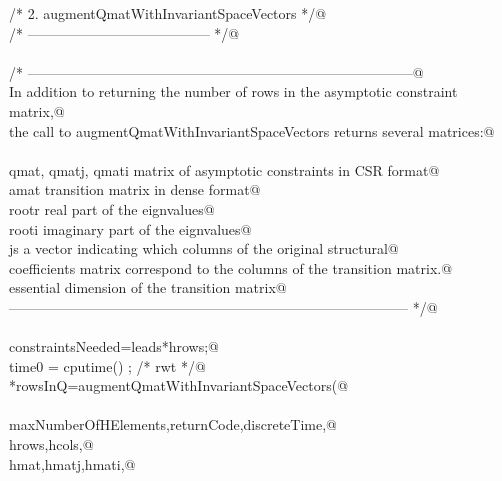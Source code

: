 \documentclass[12pt]{article}
\begin{document}
\begin{flushleft}
\begin{minipage}{\linewidth}
\begin{list}{}{}
\mbox{}\verb@        /* 2. augmentQmatWithInvariantSpaceVectors */@\\
\mbox{}\verb@        /* --------------------------------------- */@\\
\mbox{}\verb@@\\
\mbox{}\verb@        /* -----------------------------------------------------------------------------------@\\
\mbox{}\verb@        In addition to returning the number of rows in the asymptotic constraint matrix,@\\
\mbox{}\verb@        the call to augmentQmatWithInvariantSpaceVectors returns several matrices:@\\
\mbox{}\verb@@\\
\mbox{}\verb@                qmat, qmatj, qmati      matrix of asymptotic constraints in CSR format@\\
\mbox{}\verb@                amat                            transition matrix in dense format@\\
\mbox{}\verb@                rootr                           real part of the eignvalues@\\
\mbox{}\verb@                rooti                           imaginary part of the eignvalues@\\
\mbox{}\verb@                js                                      a vector indicating which columns of the original structural@\\
\mbox{}\verb@                                                        coefficients matrix correspond to the columns of the transition matrix.@\\
\mbox{}\verb@                essential                       dimension of the transition matrix@\\
\mbox{}\verb@   -------------------------------------------------------------------------------------- */@\\
\mbox{}\verb@@\\
\mbox{}\verb@        constraintsNeeded=leads*hrows;@\\
\mbox{}\verb@        time0 = cputime() ; /* rwt */@\\
\mbox{}\verb@        *rowsInQ=augmentQmatWithInvariantSpaceVectors(@\\
\mbox{}\verb@@\\
\mbox{}\verb@                maxNumberOfHElements,returnCode,discreteTime,@\\
\mbox{}\verb@        hrows,hcols,@\\
\mbox{}\verb@        hmat,hmatj,hmati,@\\

\end{list}
\end{minipage}
\end{flushleft}
\end{document}

